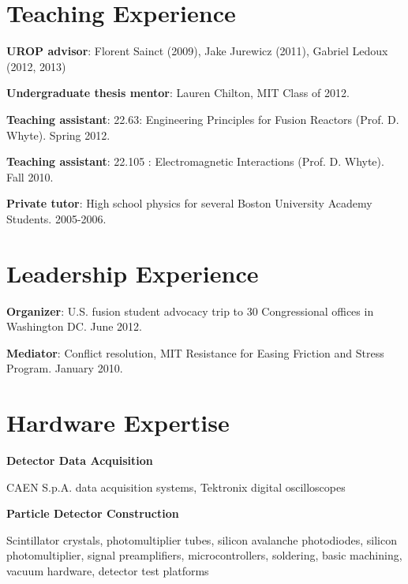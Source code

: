 \documentclass[10pt]{article}
\begin{document}
\newpage
{}

\section{Teaching Experience}
\begin{innerlist}
\item \textbf{UROP advisor}: Florent Sainct (2009), Jake Jurewicz (2011), Gabriel Ledoux (2012, 2013)
\item \textbf{Undergraduate thesis mentor}: Lauren Chilton, MIT Class of 2012.
\item \textbf{Teaching assistant}: 22.63: Engineering Principles for Fusion Reactors (Prof. D. Whyte). Spring 2012.
\item \textbf{Teaching assistant}: 22.105 : Electromagnetic Interactions (Prof. D. Whyte). Fall 2010.
\item \textbf{Private tutor}: High school physics for several Boston University Academy Students. 2005-2006. 
\end{innerlist}

\section{Leadership Experience}
\begin{innerlist}
\item \textbf{Organizer}: U.S. fusion student advocacy trip to 30 Congressional offices in Washington DC. June 2012.
\item \textbf{Mediator}: Conflict resolution, MIT Resistance for Easing Friction and Stress Program. January 2010.
\end{innerlist}

\section{Hardware Expertise}
\textbf{Detector Data Acquisition}
\begin{innerlist}
  \item CAEN S.p.A. data acquisition systems, Tektronix digital oscilloscopes
\end{innerlist}

\halfblankline

\textbf{Particle Detector Construction}
\begin{innerlist}
\item Scintillator crystals, photomultiplier tubes, silicon avalanche
  photodiodes, silicon photomultiplier, signal preamplifiers,
  microcontrollers, soldering, basic machining, vacuum hardware,
  detector test platforms
\end{innerlist}
\end{document}

